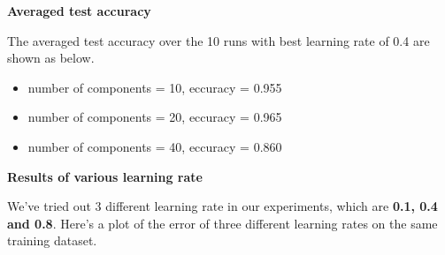 \documentclass{article} %
\begin{document}
\begin{figure}[htb]
    
\end{figure}

\textbf{Averaged test accuracy}

The averaged test accuracy over the 10 runs with best learning rate of 0.4 are shown as below.
\begin{itemize}
    \item number of components = 10, eccuracy = 0.955
    \item number of components = 20, eccuracy = 0.965
    \item number of components = 40, eccuracy = 0.860
\end{itemize}

\textbf{Results of various learning rate}

We've tried out 3 different learning rate in our experiments, which are \textbf{0.1, 0.4 and 0.8}. 
Here's a plot of the error of three different learning rates on the same training dataset.
\end{document}
